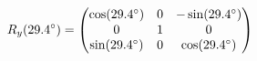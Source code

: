 \documentclass[preview]{standalone}
\begin{document}
\begin{align*}
\special{dvisvgm:raw <g id='unique000'>}R_y(29.4^\circ) = \begin{pmatrix} \cos(29.4^\circ) & 0 & -\sin(29.4^\circ) \\ 0 & 1 & 0 \\ \sin(29.4^\circ) & 0 & \cos(29.4^\circ) \end{pmatrix}\special{dvisvgm:raw </g>}
\end{align*}
\end{document}
